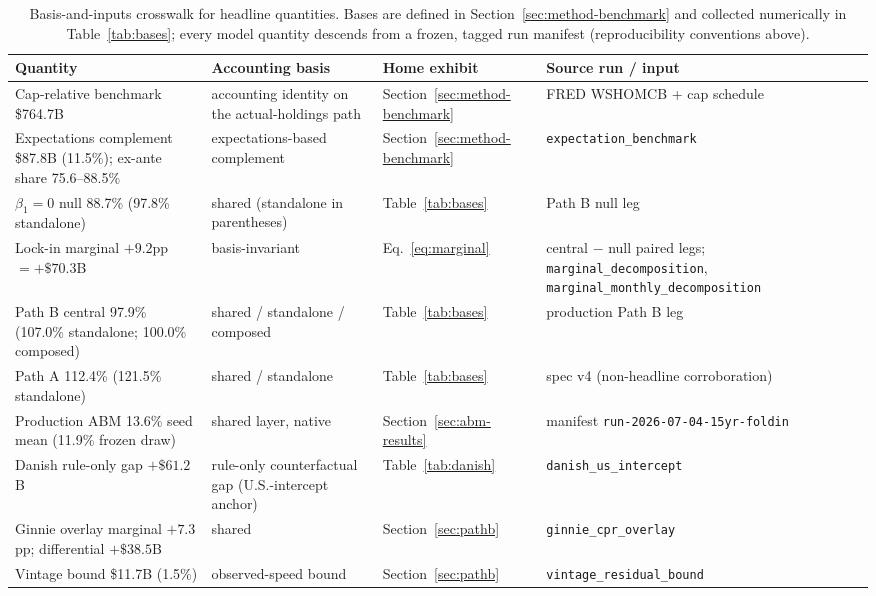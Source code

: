 \documentclass[12pt]{article}
\begin{document}
\begin{table}[H]
\centering
\footnotesize
\begin{threeparttable}
\caption{Basis-and-inputs crosswalk for headline quantities. Bases are defined in Section~\ref{sec:method-benchmark} and collected numerically in Table~\ref{tab:bases}; every model quantity descends from a frozen, tagged run manifest (reproducibility conventions above).}
\label{tab:crosswalk}
\begin{tabular}{@{}p{4.9cm}p{3.4cm}p{2.2cm}p{3.9cm}@{}}
\toprule
Quantity & Accounting basis & Home exhibit & Source run / input \\
\midrule
Cap-relative benchmark \$764.7B & accounting identity on the actual-holdings path & Section~\ref{sec:method-benchmark} & FRED WSHOMCB + cap schedule \\
Expectations complement \$87.8B (11.5\%); ex-ante share 75.6--88.5\% & expectations-based complement & Section~\ref{sec:method-benchmark} & \texttt{expectation\_benchmark} \\
$\beta_1 = 0$ null 88.7\% (97.8\% standalone) & shared (standalone in parentheses) & Table~\ref{tab:bases} & Path B null leg \\
Lock-in marginal $+9.2$pp $= +\$70.3$B & basis-invariant & Eq.~\eqref{eq:marginal} & central $-$ null paired legs; \texttt{marginal\_decomposition}, \texttt{marginal\_monthly\_decomposition} \\
Path B central 97.9\% (107.0\% standalone; 100.0\% composed) & shared / standalone / composed & Table~\ref{tab:bases} & production Path B leg \\
Path A 112.4\% (121.5\% standalone) & shared / standalone & Table~\ref{tab:bases} & spec v4 (non-headline corroboration) \\
Production ABM 13.6\% seed mean (11.9\% frozen draw) & shared layer, native & Section~\ref{sec:abm-results} & manifest \texttt{run-2026-07-04-15yr-foldin} \\
Danish rule-only gap $+\$61.2$B & rule-only counterfactual gap (U.S.-intercept anchor) & Table~\ref{tab:danish} & \texttt{danish\_us\_intercept} \\
Ginnie overlay marginal $+7.3$pp; differential $+\$38.5$B & shared & Section~\ref{sec:pathb} & \texttt{ginnie\_cpr\_overlay} \\
Vintage bound \$11.7B (1.5\%) & observed-speed bound & Section~\ref{sec:pathb} & \texttt{vintage\_residual\_bound} \\
\bottomrule
\end{tabular}
\end{threeparttable}
\end{table}
\end{document}
